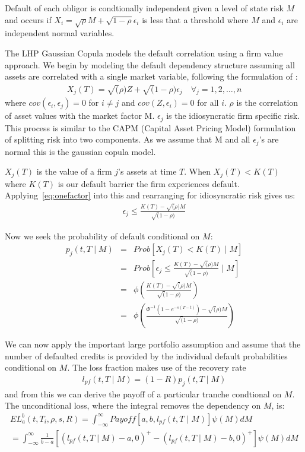 Default of each obligor is condtionally independent given a level of state risk $M$ and occurs if  $X_i = \sqrt{ \rho } M + \sqrt{ 1 - \rho } \epsilon_i$ is less that a threshold where $M$ and $\epsilon_i$ are independent normal variables.

The LHP Gaussian Copula models the default correlation using a firm value approach.  We begin by modeling the default dependency structure assuming all assets are correlated with a single market variable, following the formulation of \cite{Sch2003}:
\begin{align}\label{eq:onefactor}
X_j(T) = \sqrt(\rho) Z + \sqrt(1-\rho) \epsilon_j		\quad	\forall_j = 1, 2, \ldots, n
\end{align}
where $cov(\epsilon_i, \epsilon_j) = 0$ for $i \neq j$ and $cov(Z,\epsilon_i) = 0$ for all $i$.
$\rho$ is the correlation of asset values with the market factor M. $\epsilon_j$ is the idiosyncratic firm specific risk.  This process is similar to the CAPM (Capital Asset Pricing Model) formulation of splitting risk into two components.  As we assume that M and all $\epsilon_j$'s are normal this is the gaussian copula model.

$X_j(T)$ is the value of a firm $j$'s assets at time $T$. When $X_j(T)< K(T)$ where
$K(T)$ is our default barrier the firm experiences default.  Applying~\eqref{eq:onefactor} into this and rearranging for idiosyncratic risk gives us:
\begin{align}\label{eq:epFactor}
\epsilon_j \leq \frac{K(T) - \sqrt(\rho)M}{\sqrt(1-\rho)}
\end{align}

Now we seek the probability of default conditional on $M$:
\begin{eqnarray}
 p_j(t,T \mid M) & = & Prob[X_j(T)< K(T)\mid M] \nonumber\\
 & = & Prob[\epsilon_j \leq \frac{K(T) - \sqrt(\rho)M}{\sqrt(1-\rho)} \mid M ]  \nonumber\\ 
 & = & \phi \left( \frac{K(T) - \sqrt(\rho)M}{\sqrt(1-\rho)} \right) \nonumber \\
& = & \phi \left( \frac{\Phi^{-1}(1 - e^{-s(T-t)}) - \sqrt(\rho)M}{\sqrt(1-\rho)} \right)
\end{eqnarray}

We can now apply the important large portfolio assumption and assume that the number of defaulted credits is provided by the individual default probabilities conditional on $M$.  The loss fraction makes use of the recovery rate
\begin{align}
l_{pf}(t,T \mid M) = (1-R)  p_j(t,T \mid M)
\end{align}
and from this we can derive the payoff of a particular tranche condtional on $M$.  The unconditional loss, where the integral removes the dependency on $M$, is:
\begin{align}
EL^b_a(t,T_i,\rho ,s,R) = \int^\infty_{-\infty} Payoff\left[ a,b,l_{pf}(t,T \mid M) \right] \psi(M) dM \nonumber \\
= \int_{-\infty}^\infty \frac{1}{b-a}\left[ (l_{pf}(t,T \mid M)-a,0)^+ - (l_{pf}(t,T \mid M)-b,0)^+ \right] \psi(M) dM
\end{align}

